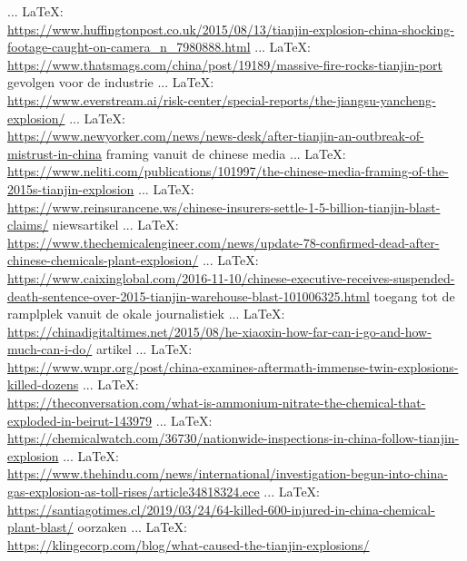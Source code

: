 \begin{thebibliography}{99}
 ... \LaTeX:\\ \url{https://www.huffingtonpost.co.uk/2015/08/13/tianjin-explosion-china-shocking-footage-caught-on-camera_n_7980888.html}
 ... \LaTeX:\\ \url{https://www.thatsmags.com/china/post/19189/massive-fire-rocks-tianjin-port}
gevolgen voor de industrie
 ... \LaTeX:\\ \url{https://www.everstream.ai/risk-center/special-reports/the-jiangsu-yancheng-explosion/}
 ... \LaTeX:\\ \url{https://www.newyorker.com/news/news-desk/after-tianjin-an-outbreak-of-mistrust-in-china}
framing vanuit de chinese media
 ... \LaTeX:\\ \url{https://www.neliti.com/publications/101997/the-chinese-media-framing-of-the-2015s-tianjin-explosion}
 ... \LaTeX:\\ \url{https://www.reinsurancene.ws/chinese-insurers-settle-1-5-billion-tianjin-blast-claims/}
niewsartikel
 ... \LaTeX:\\ \url{https://www.thechemicalengineer.com/news/update-78-confirmed-dead-after-chinese-chemicals-plant-explosion/}
 ... \LaTeX:\\ \url{https://www.caixinglobal.com/2016-11-10/chinese-executive-receives-suspended-death-sentence-over-2015-tianjin-warehouse-blast-101006325.html}
toegang tot de ramplplek vanuit de okale journalistiek
 ... \LaTeX:\\ \url{https://chinadigitaltimes.net/2015/08/he-xiaoxin-how-far-can-i-go-and-how-much-can-i-do/}
artikel
 ... \LaTeX:\\ \url{https://www.wnpr.org/post/china-examines-aftermath-immense-twin-explosions-killed-dozens}
 ... \LaTeX:\\ \url{https://theconversation.com/what-is-ammonium-nitrate-the-chemical-that-exploded-in-beirut-143979}
 ... \LaTeX:\\ \url{https://chemicalwatch.com/36730/nationwide-inspections-in-china-follow-tianjin-explosion}
 ... \LaTeX:\\ \url{https://www.thehindu.com/news/international/investigation-begun-into-china-gas-explosion-as-toll-rises/article34818324.ece}
 ... \LaTeX:\\ \url{https://santiagotimes.cl/2019/03/24/64-killed-600-injured-in-china-chemical-plant-blast/}
oorzaken
 ... \LaTeX:\\ \url{https://klingecorp.com/blog/what-caused-the-tianjin-explosions/}

\end{thebibliography}
